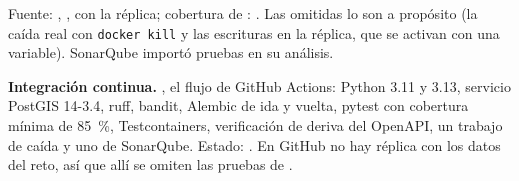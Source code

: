 \documentclass[10pt,a4paper]{article}
\begin{document}
{\footnotesize\color{rol-tinta-3}Fuente: \FuentePruebas, \CorridaPruebas, con la réplica; cobertura de
: \FuenteCobertura.} Las omitidas lo son a propósito (la caída real con \texttt{docker kill} y las
escrituras en la réplica, que se activan con una variable). SonarQube importó \SonarPruebas{} pruebas en su análisis.

\textbf{Integración continua.} , el flujo de GitHub Actions:
Python 3.11 y 3.13, servicio PostGIS 14-3.4, ruff, bandit, Alembic de ida y vuelta, pytest con cobertura mínima de
85~\%, Testcontainers, verificación de deriva del OpenAPI, un trabajo de caída y uno de SonarQube. Estado: \EstadoCI.
En GitHub no hay réplica con los datos del reto, así que allí se omiten las pruebas de .

\end{document}

